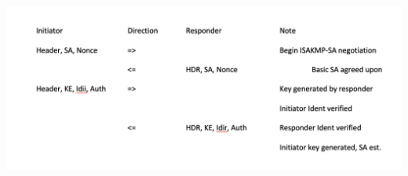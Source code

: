 \documentclass{article}
\begin{document}
\includegraphics[width=\textwidth] {ISAKMP_Neg_Procedure}
\end{document}
